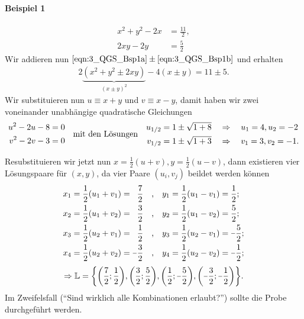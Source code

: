 \paragraph{Beispiel 1}
\begin{subequations}
    \begin{align}
        x^2 +y^2 - 2x &= \frac{11}{2}, \label{eqn:3_QGS_Bsp1a}\\
        2xy - 2y &= \frac{5}{2}\label{eqn:3_QGS_Bsp1b}
    \end{align}
\end{subequations}
Wir addieren nun $\eqref{eqn:3_QGS_Bsp1a} \pm \eqref{eqn:3_QGS_Bsp1b}$ und erhalten 
\begin{align}
    2\underbrace{(x^2 + y^2 \pm 2xy)}_{(x\pm y)^2} - 4(x\pm y) = 11 \pm 5.
\end{align}
Wir substituieren nun $u \equiv x+y$ und $v \equiv x-y$, damit haben wir zwei voneinander unabhängige quadratische Gleichungen 
\begin{align}
    \begin{split}
        u^2 - 2u -8 &= 0\\
        v^2 - 2v -3 &= 0
    \end{split} \qq{mit den Lösungen} \begin{split}
        u_{1/2} &= 1 \pm \sqrt{1+8} \quad \Rightarrow \quad u_1 = 4, u_2 = -2 \\
        v_{1/2} &= 1 \pm \sqrt{1+3} \quad \Rightarrow \quad v_1 = 3, v_2 = -1.
    \end{split}
\end{align}

Resubstituieren wir jetzt nun $x = \frac{1}{2}(u+v), y = \frac{1}{2}(u-v)$, dann existieren vier Lösungspaare für $(x,y)$, da vier Paare $(u_i, v_j)$ beildet werden können 
\begin{align}
    \begin{split}
        x_1 &= \frac{1}{2}(u_1+v_1) = \hphantom{\minus}\frac{7}{2} \qq{,} y_1 = \frac{1}{2}(u_1-v_1) = \frac{1}{2};\\
        x_2 &= \frac{1}{2}(u_1+v_2) = \hphantom{\minus}\frac{3}{2} \qq{,} y_2 = \frac{1}{2}(u_1-v_2) = \frac{5}{2};\\
        x_3 &= \frac{1}{2}(u_2+v_1) = \hphantom{\minus}\frac{1}{2} \qq{,} y_3 = \frac{1}{2}(u_2-v_1) = \minus\frac{5}{2};\\
        x_4 &= \frac{1}{2}(u_2+v_2) = \minus\frac{3}{2}             \qq{,} y_4 = \frac{1}{2}(u_2-v_2) = \minus\frac{1}{2};
    \end{split}
\end{align}
\begin{align}
    \Rightarrow \mathbb{L} = \qty{\qty(\frac{7}{2};\frac{1}{2}),\qty(\frac{3}{2};\frac{5}{2}),\qty(\frac{1}{2};\minus\frac{5}{2}),\qty(\minus\frac{3}{2};\minus\frac{1}{2})}.
\end{align}
Im Zweifelsfall (``Sind wirklich alle Kombinationen erlaubt?'') sollte die Probe durchgeführt werden. 

